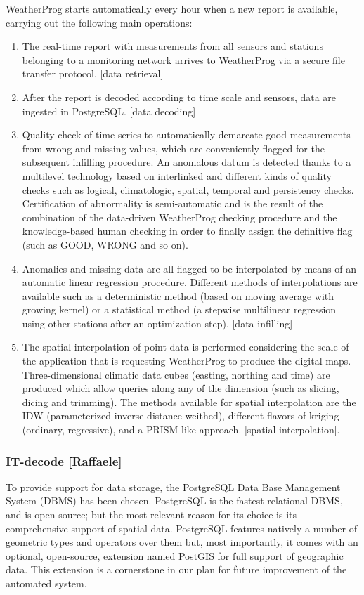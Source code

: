 \documentclass[authoryear,preprint,review,12pt]{elsarticle}
\begin{document}
WeatherProg starts automatically every hour when a new report is available, carrying out the following main operations:
\begin{enumerate}
    \item The real-time report with measurements from all sensors and stations belonging to a monitoring network arrives to WeatherProg via a secure file transfer protocol. [data retrieval]
    
    \item After the report is decoded according to time scale and sensors, data are ingested in PostgreSQL. [data decoding]

    \item Quality check of time series to automatically demarcate good measurements from wrong and missing values, which are conveniently flagged for the subsequent infilling procedure.
    An anomalous datum is detected thanks to a multilevel technology based on interlinked and different kinds of quality checks such as logical, climatologic, spatial, temporal and persistency checks. Certification of abnormality is semi-automatic and is the result of the combination of the data-driven WeatherProg checking procedure and the knowledge-based human checking in order to finally assign the definitive flag (such as GOOD, WRONG and so on).
    
    \item Anomalies and missing data are all flagged to be interpolated by means of an automatic linear regression procedure.
    Different methods of interpolations are available such as a deterministic method (based on moving average with growing kernel) or a statistical method (a stepwise multilinear regression using other stations after an optimization step). [data infilling]
    
    \item The spatial interpolation of point data is performed considering the scale of the application that is requesting WeatherProg to produce the digital maps.
    Three-dimensional climatic data cubes (easting, northing and time) are produced which allow queries along any of the dimension (such as slicing, dicing and trimming). The methods available for spatial interpolation are the IDW (parameterized inverse distance weithed), different flavors of kriging (ordinary, regressive), and a PRISM-like approach. [spatial interpolation].
\end{enumerate}

\subsubsection{IT-decode [Raffaele]}\label{decode}
To provide support for data storage, the PostgreSQL Data Base Management System (DBMS) \citep{postgres} has been chosen. PostgreSQL is the fastest relational DBMS, and is open-source; but the most relevant reason for its choice is its comprehensive support of spatial data. PostgreSQL features natively a number of geometric types and operators over them but, most importantly, it comes with an optional, open-source, extension named PostGIS for full support of geographic data. This extension is a cornerstone in our plan for future improvement of the automated system.
\end{document}
